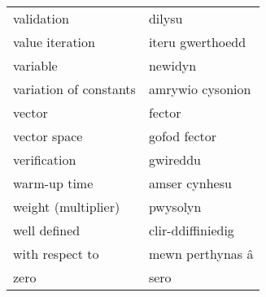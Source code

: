 \begin{supertabular}{p{0.22\textwidth}p{0.22\textwidth}}
validation & dilysu \\
value iteration & iteru gwerthoedd \\
variable & newidyn \\
variation of constants & amrywio cysonion \\
vector & fector \\
vector space & gofod fector \\
verification & gwireddu \\
warm-up time & amser cynhesu \\
weight (multiplier) & pwysolyn \\
well defined & clir-ddiffiniedig \\
with respect to & mewn perthynas â \\
zero & sero \\
\end{supertabular}
